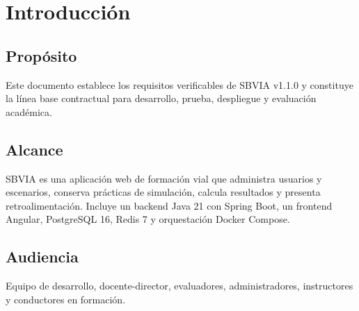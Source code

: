 \documentclass[11pt,a4paper]{article}
\begin{document}
\newpage

\section{Introducción}

\subsection{Propósito}
Este documento establece los requisitos verificables de SBVIA v1.1.0 y constituye la línea base contractual para desarrollo, prueba, despliegue y evaluación académica.

\subsection{Alcance}
SBVIA es una aplicación web de formación vial que administra usuarios y escenarios, conserva prácticas de simulación, calcula resultados y presenta retroalimentación. Incluye un backend Java 21 con Spring Boot, un frontend Angular, PostgreSQL 16, Redis 7 y orquestación Docker Compose.

\subsection{Audiencia}
Equipo de desarrollo, docente-director, evaluadores, administradores, instructores y conductores en formación.
\end{document}
